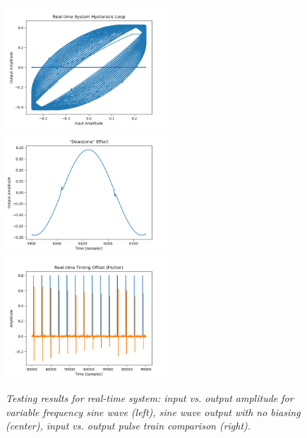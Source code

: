 \documentclass[twoside,a4paper]{article}
\begin{document}
\begin{figure}[!ht]
    \includegraphics[width=2.4in]{../Testing/HysteresisTest.png}
    \includegraphics[width=2.4in]{../Testing/DeadzoneTest.png}
    \includegraphics[width=2.4in]{../Testing/FlutterTest.png}
    \caption{\label{tests}{\it Testing results for real-time system:
                                    input vs. output amplitude for variable
                                    frequency sine wave (left), sine wave output
                                    with no biasing (center), input vs. output
                                    pulse train comparison (right).}}
\end{figure}
%
\end{document}
